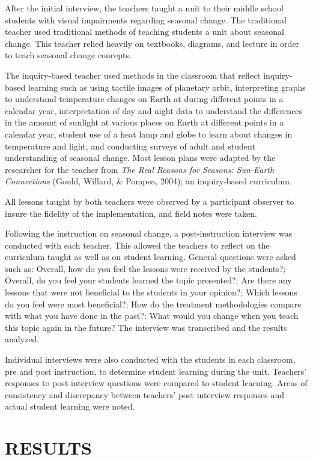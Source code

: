\documentclass[11.5pt]{sig-alternate} %
\begin{document}
\begin{large}
After the initial interview, the teachers taught a unit to their middle school students with visual impairments regarding seasonal change.  The traditional teacher used traditional methods of teaching students a unit about seasonal change.  This teacher relied heavily on textbooks, diagrams, and lecture in order to teach seasonal change concepts.

The inquiry-based teacher used methods in the classroom that reflect inquiry-based learning such as using tactile images of planetary orbit, interpreting graphs to understand temperature changes on Earth at during different points in a calendar year, interpretation of day and night data to understand the differences in the amount of sunlight at various places on Earth at different points in a calendar year, student use of a heat lamp and globe to learn about changes in temperature and light, and conducting surveys of adult and student understanding of seasonal change. Most lesson plans were adapted by the researcher for the teacher from \textit{The Real Reasons for Seasons: Sun-Earth Connections} (Gould, Willard, \& Pompea, 2004); an inquiry-based curriculum.  

All lessons taught by both teachers were observed by a participant observer to insure the fidelity of the implementation, and field notes were taken.

Following the instruction on seasonal change, a post-instruction interview was conducted with each teacher. This allowed the teachers to reflect on the curriculum taught as well as on student learning. General questions were asked such as: Overall, how do you feel the lessons were received by the students?; Overall, do you feel your students learned the topic presented?; Are there any lessons that were not beneficial to the students in your opinion?; Which lessons do you feel were most beneficial?; How do the treatment methodologies compare with what you have done in the past?; What would you change when you teach this topic again in the future? The interview was transcribed and the results analyzed.  

Individual interviews were also conducted with the students in each classroom, pre and post instruction, to determine student learning during the unit.  Teachers’ responses to post-interview questions were compared to student learning.  Areas of consistency and discrepancy between teachers’ post interview responses and actual student learning were noted. \\

\section*{RESULTS}


\end{large}
\end{document}
